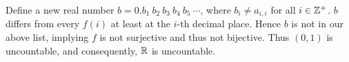 \documentclass[17pt, a2paper, portrait]{tikzposter}
\begin{document}
\begin{columns}
{Define a new real number $b=0.b_1\:b_2\:b_3\:b_4\:b_5\:\cdots$, where $b_i \neq a_{i,i}$ for all $i\in\mathbb Z^+$. $b$ differs from every $f(i)$ at least at the $i$-th decimal place. Hence $b$ is not in our above list, implying $f$ is not surjective and thus not bijective. Thus $(0,1)$ is uncountable, and consequently, $\mathbb R$ is uncountable.
}
\end{columns}
\end{document}

